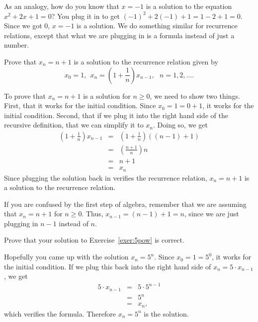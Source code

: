 As an analogy, how do you know that $x=-1$ is a solution to the equation $x^2+2x+1=0$?
You plug it in to get $(-1)^2+2(-1)+1=1-2+1=0$.  Since we got $0$, $x=-1$ is a solution.
We do something similar for recurrence relations, 
except that what we are plugging in is a formula instead of just a number.

\begin{exa}\label{exa:firstVerify}
Prove that $x_n=n+1$ is a solution to the recurrence relation given by 
$$x_0 = 1,\ \  x_n = \left(1 + \frac{1}{n}\right)x_{n-1},\ \ \ n
= 1, 2, \ldots .$$
\begin{pf}
To prove that $x_n=n+1$ is a solution for $n\geq 0$, 
we need to show two things.  First, that it works for the initial condition.
Since $x_0=1=0+1$, it works for the initial condition.
Second, that if we plug it into the right hand side of the recursive definition, that
we can simplify it to $x_n$.  Doing so, we get 
\begin{eqnarray*}
\left(1 + \frac{1}{n}\right)x_{n-1} &= &\left(1 + \frac{1}{n}\right)((n-1)+1)\\
&=&\left(\frac{n+1}{n}\right)n\\
&=&n+1\\
&=&x_n
\end{eqnarray*}
Since plugging the solution back in verifies the recurrence relation, 
$x_n=n+1$ is a solution to the recurrence relation.

If you are confused by the first step of algebra, remember that we are assuming that $x_n=n+1$ for $n\geq 0$.
Thus, $x_{n-1}=(n-1)+1=n$, since we are just plugging in $n-1$ instead of $n$.
\end{pf}
\end{exa}

\begin{exer}
Prove that your solution to Exercise~\ref{exer:5pow} is correct.

\vspace*{2.5in}
\begin{answer}
Hopefully you came up with the solution $x_n=5^n$.  
Since $x_0=1=5^0$, it works for the initial condition.
If we plug this back into the
right hand side of $x_n=5\cdot x_{n-1}$,  we get
\begin{eqnarray*}
5\cdot x_{n-1}&=&5\cdot 5^{n-1}\\
&=&5^n\\
&=&x_n,
\end{eqnarray*}
which verifies the formula.  Therefore $x_n=5^n$ is the solution.
\end{answer}
\end{exer}

